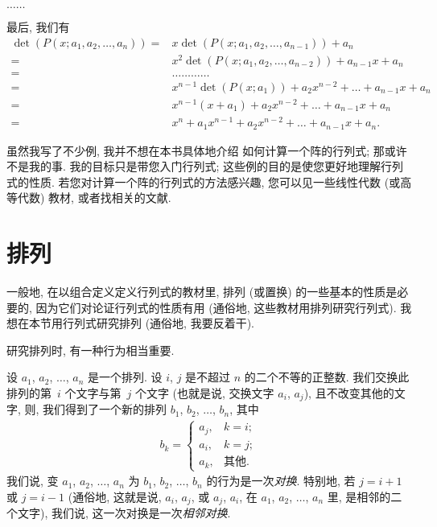 \begin{example}
    \(\dots \dots\)

    最后, 我们有
    \begin{align*}
        \det {(P(x; a_1, a_2, \dots, a_n))}
        = {} &
        x \det {(P(x; a_1, a_2, \dots, a_{n-1}))} + a_n
        \\
        = {} &
        x^2 \det {(P(x; a_1, a_2, \dots, a_{n-2}))} + a_{n-1} x + a_n
        \\
        = {} &
        \dots \dots \dots \dots
        \\
        = {} &
        x^{n-1} \det {(P(x; a_1))} + a_2 x^{n-2} + \dots + a_{n-1} x + a_n
        \\
        = {} &
        x^{n-1} (x + a_1) + a_2 x^{n-2} + \dots + a_{n-1} x + a_n
        \\
        = {} &
        x^n + a_1 x^{n-1} + a_2 x^{n-2} + \dots + a_{n-1} x + a_n.
    \end{align*}
\end{example}

虽然我写了不少例,
我并不想在本书具体地介绍%
如何计算一个阵的行列式;
那或许不是我的事.
我的目标只是带您入门行列式;
这些例的目的是使您更好地理解行列式的性质.
若您对计算一个阵的行列式的方法感兴趣,
您可以见一些线性代数 (或高等代数) 教材,
或者找相关的文献.

\section{排列}

一般地, 在以组合定义定义行列式的教材里,
排列 (或置换) 的一些基本的性质是必要的,
因为它们对论证行列式的性质有用
(通俗地, 这些教材用排列研究行列式).
我想在本节用行列式研究排列
(通俗地, 我要反着干).

研究排列时, 有一种行为相当重要.

\begin{definition}[对换]
    设 \(a_1\), \(a_2\), \(\dots\), \(a_n\) 是一个排列.
    设 \(i\), \(j\) 是不超过 \(n\) 的二个不等的正整数.
    我们交换此排列的第~\(i\) 个文字与第~\(j\) 个文字
    (也就是说, 交换文字 \(a_i\), \(a_j\)),
    且不改变其他的文字,
    则, 我们得到了一个新的排列
    \(b_1\), \(b_2\), \(\dots\), \(b_n\),
    其中
    \begin{align*}
        b_k
        = \begin{cases}
              a_j, & k = i;     \\
              a_i, & k = j;     \\
              a_k, & \text{其他}.
          \end{cases}
    \end{align*}
    我们说, 变 \(a_1\), \(a_2\), \(\dots\), \(a_n\)
    为 \(b_1\), \(b_2\), \(\dots\), \(b_n\)
    的行为是一次\emph{对换}.
    特别地, 若 \(j = i + 1\) 或
    \(j = i - 1\)
    (通俗地, 这就是说,
    \(a_i\), \(a_j\), 或 \(a_j\), \(a_i\), 在
    \(a_1\), \(a_2\), \(\dots\), \(a_n\) 里,
    是相邻的二个文字),
    我们说, 这一次对换是一次\emph{相邻对换}.
\end{definition}

